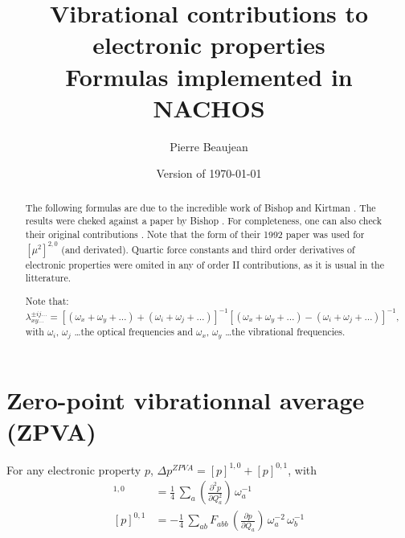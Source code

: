 \documentclass[12pt,a4paper]{article}
\title{Vibrational contributions to electronic properties \\ Formulas implemented in NACHOS}
\author{Pierre Beaujean}
\date{Version of \today}
\begin{document}
\maketitle

\allowdisplaybreaks

\begin{abstract}
The following formulas are due to the incredible work of Bishop and Kirtman \cite{bishop_additional_1998}. The results were cheked against a paper by Bishop \cite{bishop_static_1998}. For completeness, one can also check their original contributions \cite{kirtman_evaluation_1990,bishop_perturbation_1991,bishop_compact_1992}. Note that the form of their 1992 paper \cite{bishop_compact_1992} was used for $[\mu^2]^{2,0}$ (and derivated). Quartic force constants and third order derivatives of electronic properties were omited in any of order II contributions, as it is usual in the litterature.

Note that:
\begin{equation*}
\lambda^{\pm ij\ldots}_{xy\ldots}= [(\omega_x+\omega_y+\ldots) +(\omega_i+\omega_j+\ldots)]^{-1}
 [(\omega_x+\omega_y+\ldots)-(\omega_i+\omega_j+\ldots)]^{-1},
\end{equation*}
with $\omega_i$, $\omega_j$ \ldots the optical frequencies and $\omega_{x}$, $\omega_y$ \ldots the vibrational frequencies.
\end{abstract}

\newcommand{\tdiff}[2]{\left(\frac{\partial #1}{ \partial #2}\right)}
\newcommand{\lb}[2]{\lambda^{\pm #1}_{#2}}

\section{Zero-point vibrationnal average (ZPVA)}
For any electronic property $p$, $\Delta{p}^{ZPVA} = [p]^{1,0} + [p]^{0,1}$, with
\begin{align}
[p]^{1,0} &= \frac{1}{4}\,\sum_a \tdiff{^2p}{Q_a^2}\,\omega_a^{-1} \\
[p]^{0,1} &= -\frac{1}{4}\,\sum_{ab} F_{abb}\,\tdiff{p}{Q_a}\,\omega_a^{-2}\,\omega_b^{-1} 
\end{align}
\end{document}

